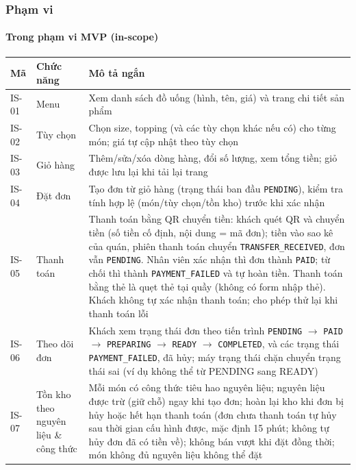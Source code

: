 \subsubsection{Phạm vi}

\paragraph{Trong phạm vi MVP (in-scope)}

{\small\renewcommand{\arraystretch}{1.25}
\begin{tabularx}{\linewidth}{@{}l l X@{}}
\toprule
\textbf{Mã} & \textbf{Chức năng} & \textbf{Mô tả ngắn} \\
\midrule
IS-01 & Menu & Xem danh sách đồ uống (hình, tên, giá) và trang chi tiết sản phẩm \\
IS-02 & Tùy chọn & Chọn size, topping (và các tùy chọn khác nếu có) cho từng món; giá tự cập nhật theo tùy chọn \\
IS-03 & Giỏ hàng & Thêm/sửa/xóa dòng hàng, đổi số lượng, xem tổng tiền; giỏ được lưu lại khi tải lại trang \\
IS-04 & Đặt đơn & Tạo đơn từ giỏ hàng (trạng thái ban đầu \texttt{PENDING}), kiểm tra tính hợp lệ (món/tùy chọn/tồn kho) trước khi xác nhận \\
IS-05 & Thanh toán & Thanh toán bằng QR chuyển tiền: khách quét QR và chuyển tiền (số tiền cố định, nội dung = mã đơn); tiền vào sao kê của quán, phiên thanh toán chuyển \texttt{TRANSFER\_RECEIVED}, đơn vẫn \texttt{PENDING}. Nhân viên xác nhận thì đơn thành \texttt{PAID}; từ chối thì thành \texttt{PAYMENT\_FAILED} và tự hoàn tiền. Thanh toán bằng thẻ là quẹt thẻ tại quầy (không có form nhập thẻ). Khách không tự xác nhận thanh toán; cho phép thử lại khi thanh toán lỗi \\
IS-06 & Theo dõi đơn & Khách xem trạng thái đơn theo tiến trình \texttt{PENDING} $\rightarrow$ \texttt{PAID} $\rightarrow$ \texttt{PREPARING} $\rightarrow$ \texttt{READY} $\rightarrow$ \texttt{COMPLETED}, và các trạng thái \texttt{PAYMENT\_FAILED}, đã hủy; máy trạng thái chặn chuyển trạng thái sai (ví dụ không thể từ PENDING sang READY) \\
IS-07 & Tồn kho theo nguyên liệu \& công thức & Mỗi món có công thức tiêu hao nguyên liệu; nguyên liệu được trừ (giữ chỗ) ngay khi tạo đơn; hoàn lại kho khi đơn bị hủy hoặc hết hạn thanh toán (đơn chưa thanh toán tự hủy sau thời gian cấu hình được, mặc định 15 phút; không tự hủy đơn đã có tiền về); không bán vượt khi đặt đồng thời; món không đủ nguyên liệu không thể đặt \\

\end{tabularx}}
